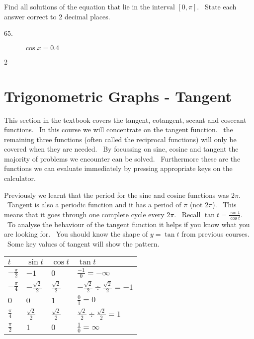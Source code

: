 Find all solutions of the equation that lie in the interval $\left [0 ,\pi \right ]$. \ State each answer
correct to 2 decimal places. 


\begin{description}
\item [65.] $\cos  x =0.4$ \end{description}


\columnsep =30pt
\begin {multicols}{2}
 


\end {multicols}


\section{Trigonometric Graphs - Tangent}

This section in the textbook covers the tangent, cotangent, secant and cosecant functions. \ In
this course we will concentrate on the tangent function. \ the remaining three functions (often called the reciprocal
functions) will only be covered when they are needed. \ By focussing on sine, cosine and tangent the majority
of problems we encounter can be solved. \ Furthermore these are the functions we can evaluate immediately by pressing
appropriate keys on the calculator. 

Previously we learnt that the period for the sine and cosine functions was $2 \pi $. \ Tangent is also a periodic function and it has a period of $\pi $ (not $2 \pi $). \ This means that it goes through one complete cycle every $2 \pi $. \ Recall $\tan  t =\frac{\sin  t}{\cos  t}$. \ To analyse the behaviour of the tangent function it helps if you know what you are looking
for. \ You should know the shape of $y =\tan  t$ from previous courses. \ Some key values of tangent will show the pattern. 


\begin{tabular}[c]{|l|l|l|l|}\hline
$t$  & $\sin  t$  & $\cos  t$  & $\tan  t$  \\
\hline
$ -\frac{\pi }{2}$  & $ -1$  & $0$  & $\frac{ -1}{0} = -\infty $  \\
\hline
$ -\frac{\pi }{4}$  & $ -\frac{\sqrt{2}}{2}$  & $\frac{\sqrt{2}}{2}$  & $ -\frac{\sqrt{2}}{2} \div \frac{\sqrt{2}}{2} = -1$  \\
\hline
$0$  & $0$  & $1$  & $\frac{0}{1} =0$  \\
\hline
$\frac{\pi }{4}$  & $\frac{\sqrt{2}}{2}$  & $\frac{\sqrt{2}}{2}$  & $\frac{\sqrt{2}}{2} \div \frac{\sqrt{2}}{2} =1$  \\
\hline
$\frac{\pi }{2}$  & $1$  & $0$  & $\frac{1}{0} =\infty $  \\
\hline
\end{tabular}

